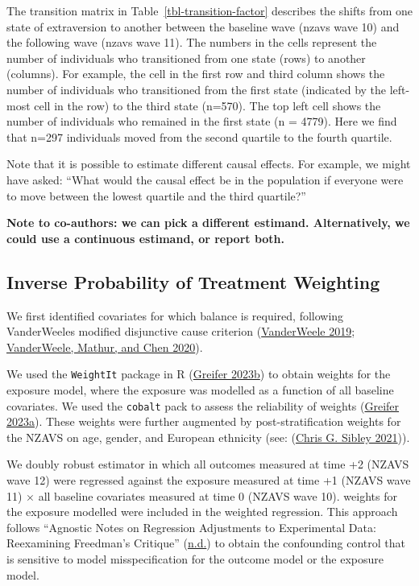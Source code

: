 \documentclass[
  singlecolumn]{report}
\begin{document}
The transition matrix in Table~\ref{tbl-transition-factor} describes the
shifts from one state of extraversion to another between the baseline
wave (nzavs wave 10) and the following wave (nzavs wave 11). The numbers
in the cells represent the number of individuals who transitioned from
one state (rows) to another (columns). For example, the cell in the
first row and third column shows the number of individuals who
transitioned from the first state (indicated by the left-most cell in
the row) to the third state (n=570). The top left cell shows the number
of individuals who remained in the first state (n = 4779). Here we find
that n=297 individuals moved from the second quartile to the fourth
quartile.

Note that it is possible to estimate different causal effects. For
example, we might have asked: ``What would the causal effect be in the
population if everyone were to move between the lowest quartile and the
third quartile?''

\textbf{Note to co-authors: we can pick a different estimand.
Alternatively, we could use a continuous estimand, or report both.}

\hypertarget{inverse-probability-of-treatment-weighting}{%
\subsection{Inverse Probability of Treatment
Weighting}\label{inverse-probability-of-treatment-weighting}}

We first identified covariates for which balance is required, following
VanderWeeles modified disjunctive cause criterion
(\protect\hyperlink{ref-vanderweele2019}{VanderWeele 2019};
\protect\hyperlink{ref-vanderweele2020}{VanderWeele, Mathur, and Chen
2020}).

We used the \texttt{WeightIt} package in R
(\protect\hyperlink{ref-greifer2023a}{Greifer 2023b}) to obtain weights
for the exposure model, where the exposure was modelled as a function of
all baseline covariates. We used the \texttt{cobalt} pack to assess the
reliability of weights (\protect\hyperlink{ref-greifer2023b}{Greifer
2023a}). These weights were further augmented by post-stratification
weights for the NZAVS on age, gender, and European ethnicity (see:
(\protect\hyperlink{ref-sibley2021}{Chris G. Sibley 2021})).

We doubly robust estimator in which all outcomes measured at time +2
(NZAVS wave 12) were regressed against the exposure measured at time +1
(NZAVS wave 11) \(\times\) all baseline covariates measured at time 0
(NZAVS wave 10). weights for the exposure modelled were included in the
weighted regression. This approach follows {``Agnostic Notes on
Regression Adjustments to Experimental Data: Reexamining Freedman{'}s
Critique''} (\protect\hyperlink{ref-agnostic}{n.d.}) to obtain the
confounding control that is sensitive to model misspecification for the
outcome model or the exposure model.
\end{document}
